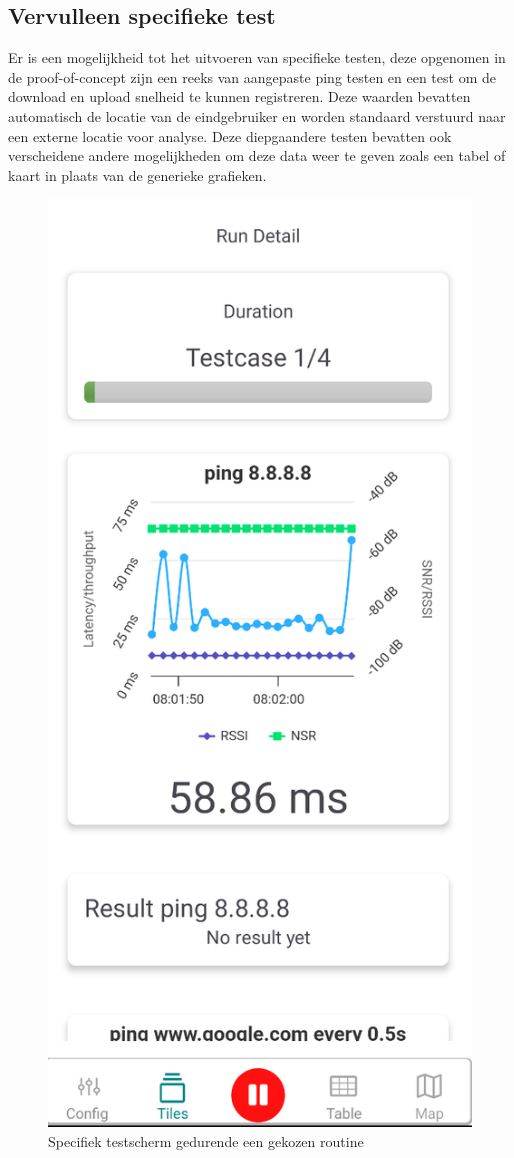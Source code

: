 \subsection{Vervulleen specifieke test}

Er is een mogelijkheid tot het uitvoeren van specifieke testen, deze opgenomen in de proof-of-concept zijn een reeks van aangepaste ping testen en een test om de download en upload snelheid te kunnen registreren. Deze waarden bevatten automatisch de locatie van de eindgebruiker en worden standaard verstuurd naar een externe locatie voor analyse. Deze diepgaandere testen bevatten ook verscheidene andere mogelijkheden om deze data weer te geven zoals een tabel of kaart in plaats van de generieke grafieken.

\begin{figure}[!htb]
    \includegraphics[width=0.3\linewidth]{graphics/specifictest}
    \caption[Specifiek testscherm gedurende een gekozen routine]{Specifiek testscherm gedurende een gekozen routine}
    \label{fig:specifictest}
\end{figure}